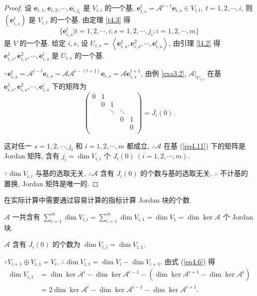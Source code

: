 \documentclass{ctexart}
\begin{document}
\begin{proof}
    设 $\boldsymbol{e}_{i,1},\boldsymbol{e}_{i,2},\cdots,\boldsymbol{e}_{i,j_i}$ 是 $V_{i,i}$ 的一个基, $\boldsymbol{e}_{i,s}^t=\mathcal{A}^{i-t}\boldsymbol{e}_{i,s}\in V_{i,t},\ t=1,2,\cdots,i$, 则 $(\boldsymbol{e}_{i,s}^t)$ 是 $V_{i,t}$ 的一个基. 由定理 \ref{t4.3} 得
    \begin{equation}\label{eq4.11}
        \{\boldsymbol{e}_{i,s}^t|t=1,2,\cdots,i;s=1,2,\cdots,j_i;i=1,2,\cdots,m\}
    \end{equation}
    是 $V$ 的一个基. 给定 $i,s$, 设 $U_{i,s}=\left<\boldsymbol{e}_{i,s}^1,\boldsymbol{e}_{i,s}^2,\cdots,\boldsymbol{e}_{i,s}^i\right>$, 由引理 \ref{l4.2} 得 $\boldsymbol{e}_{i,s}^1,\boldsymbol{e}_{i,s}^2,\cdots,\boldsymbol{e}_{i,s}^i$ 是 $U_{i,s}$ 的一个基.
    
    $\because\boldsymbol{e}_{i,s}^t=\mathcal{A}^{i-t}\boldsymbol{e}_{i,s}=\mathcal{A}\mathcal{A}^{i-(t+1)}\boldsymbol{e}_{i,s}=\mathcal{A}\boldsymbol{e}_{i,s}^{t+1}$, 由例 \ref{exa3.2}, $\mathcal{A}|_{U_{i,s}}$ 在基 $\boldsymbol{e}_{i,s}^1,\boldsymbol{e}_{i,s}^2,\cdots,\boldsymbol{e}_{i,s}^i$ 下的矩阵为
    \[\begin{pmatrix}
        0 & 1 \\
        & 0 & 1 \\
        && \ddots & \ddots \\
        &&& 0 & 1 \\
        &&&& 0 \\
    \end{pmatrix}=J_i(0).\]

    这对任一 $s=1,2,\cdots,j_i$ 和 $i=1,2,\cdots,m$ 都成立, $\therefore\mathcal{A}$ 在基 (\ref{eq4.11}) 下的矩阵是 Jordan 矩阵, 含有 $j_i=\dim V_{i,i}$ 个 $J_i(0)\ (i=1,2,\cdots,m)$.

    $\because\dim V_{i,i}$ 与基的选取无关, $\therefore\mathcal{A}$ 含有 $J_i(0)$ 的个数与基的选取无关. $\therefore$ 不计基的置换, Jordan 矩阵是唯一的.
\end{proof}
\begin{note}
    在实际计算中需要通过容易计算的指标计算 Jordan 块的个数.

    $\mathcal{A}$ 一共含有 $\sum\limits_{i=1}^m\dim V_{i,i}=\sum\limits_{i=1}^m\dim V_{i,1}=\dim V_1=\dim\ker\mathcal{A}$ 个 Jordan 块.

    $\mathcal{A}$ 含有 $J_i(0)$ 的个数为 $\dim V_{i,i}=\dim V_{i,1}$.
    
    $\because V_{i+1}\oplus V_{i,1}=V_i$, $\therefore\dim V_{i,1}=\dim V_i-\dim V_{i+1}$. 由式 (\ref{eq4.6}) 得
    \begin{align*}
        \dim V_{i,1} & =\dim\ker\mathcal{A}^i-\dim\ker\mathcal{A}^{i-1}-(\dim\ker\mathcal{A}^{i+1}-\dim\ker\mathcal{A}^i) \\
        & =2\dim\ker\mathcal{A}^i-\dim\ker\mathcal{A}^{i-1}-\dim\ker\mathcal{A}^{i+1}.
    \end{align*}
\end{note}
\end{document}
